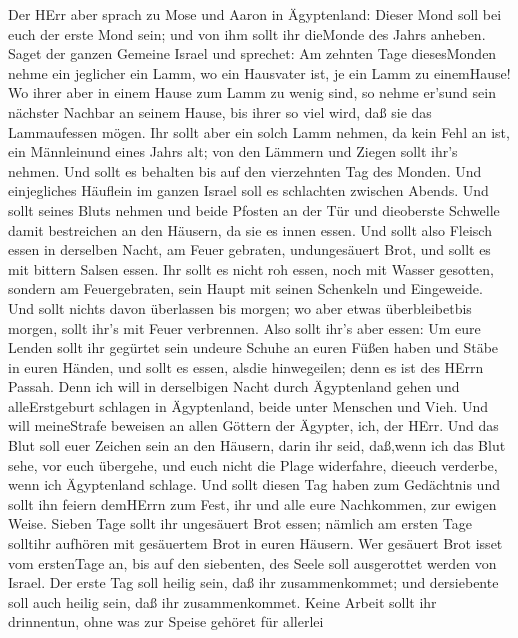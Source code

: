  Der HErr aber sprach zu Mose und Aaron in Ägyptenland:
 Dieser Mond soll bei euch der erste Mond sein; und von ihm
sollt ihr dieMonde des Jahrs anheben.  Saget der ganzen
Gemeine Israel und sprechet: Am zehnten Tage diesesMonden nehme ein
jeglicher ein Lamm, wo ein Hausvater ist, je ein Lamm zu einemHause!
 Wo ihrer aber in einem Hause zum Lamm zu wenig sind, so
nehme er'sund sein nächster Nachbar an seinem Hause, bis ihrer so viel
wird, daß sie das Lammaufessen mögen.  Ihr sollt aber ein
solch Lamm nehmen, da kein Fehl an ist, ein Männleinund eines Jahrs alt;
von den Lämmern und Ziegen sollt ihr's nehmen.  Und sollt es
behalten bis auf den vierzehnten Tag des Monden. Und einjegliches
Häuflein im ganzen Israel soll es schlachten zwischen Abends.
 Und sollt seines Bluts nehmen und beide Pfosten an der Tür
und dieoberste Schwelle damit bestreichen an den Häusern, da sie es
innen essen.  Und sollt also Fleisch essen in derselben
Nacht, am Feuer gebraten, undungesäuert Brot, und sollt es mit bittern
Salsen essen.  Ihr sollt es nicht roh essen, noch mit Wasser
gesotten, sondern am Feuergebraten, sein Haupt mit seinen Schenkeln und
Eingeweide.  Und sollt nichts davon überlassen bis morgen;
wo aber etwas überbleibetbis morgen, sollt ihr's mit Feuer verbrennen.
 Also sollt ihr's aber essen: Um eure Lenden sollt ihr
gegürtet sein undeure Schuhe an euren Füßen haben und Stäbe in euren
Händen, und sollt es essen, alsdie hinwegeilen; denn es ist des HErrn
Passah.  Denn ich will in derselbigen Nacht durch
Ägyptenland gehen und alleErstgeburt schlagen in Ägyptenland, beide
unter Menschen und Vieh. Und will meineStrafe beweisen an allen Göttern
der Ägypter, ich, der HErr.  Und das Blut soll euer Zeichen
sein an den Häusern, darin ihr seid, daß,wenn ich das Blut sehe, vor
euch übergehe, und euch nicht die Plage widerfahre, dieeuch verderbe,
wenn ich Ägyptenland schlage.  Und sollt diesen Tag haben
zum Gedächtnis und sollt ihn feiern demHErrn zum Fest, ihr und alle eure
Nachkommen, zur ewigen Weise.  Sieben Tage sollt ihr
ungesäuert Brot essen; nämlich am ersten Tage solltihr aufhören mit
gesäuertem Brot in euren Häusern. Wer gesäuert Brot isset vom erstenTage
an, bis auf den siebenten, des Seele soll ausgerottet werden von Israel.
 Der erste Tag soll heilig sein, daß ihr zusammenkommet;
und dersiebente soll auch heilig sein, daß ihr zusammenkommet. Keine
Arbeit sollt ihr drinnentun, ohne was zur Speise gehöret für allerlei
